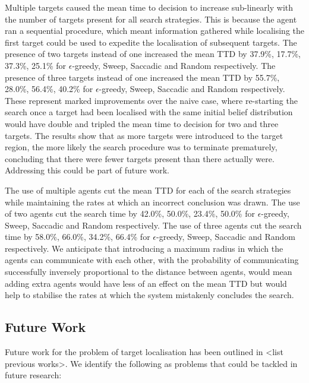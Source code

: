 Multiple targets caused the mean time to decision to increase sub-linearly with the number of targets present for all search strategies. This is because the agent ran a sequential procedure, which meant information gathered while localising the first target could be used to expedite the localisation of subsequent targets. The presence of two targets instead of one increased the mean TTD by 37.9\%, 17.7\%, 37.3\%, 25.1\% for $\epsilon$-greedy, Sweep, Saccadic and Random respectively. The presence of three targets instead of one increased the mean TTD by 55.7\%,  28.0\%, 56.4\%, 40.2\% for $\epsilon$-greedy, Sweep, Saccadic and Random respectively. These represent marked improvements over the naive case, where re-starting the search once a target had been localised with the same initial belief distribution would have double and tripled the mean time to decision for two and three targets. The results show that as more targets were introduced to the target region, the more likely the search procedure was to terminate prematurely, concluding that there were fewer targets present than there actually were. Addressing this could be part of future work.\par

The use of multiple agents cut the mean TTD for each of the search strategies while maintaining the rates at which an incorrect conclusion was drawn. The use of two agents cut the search time by 42.0\%, 50.0\%, 23.4\%, 50.0\% for $\epsilon$-greedy, Sweep, Saccadic and Random respectively. The use of three agents cut the search time by 58.0\%, 66.0\%, 34.2\%, 66.4\% for $\epsilon$-greedy, Sweep, Saccadic and Random respectively. We anticipate that introducing a maximum radius in which the agents can communicate with each other, with the probability of communicating successfully inversely proportional to the distance between agents, would mean adding extra agents would have less of an effect on the mean TTD but would help to stabilise the rates at which the system mistakenly concludes the search.

\subsection{Future Work}
Future work for the problem of target localisation has been outlined in <list previous works>. We identify the following as problems that could be tackled in future research:

